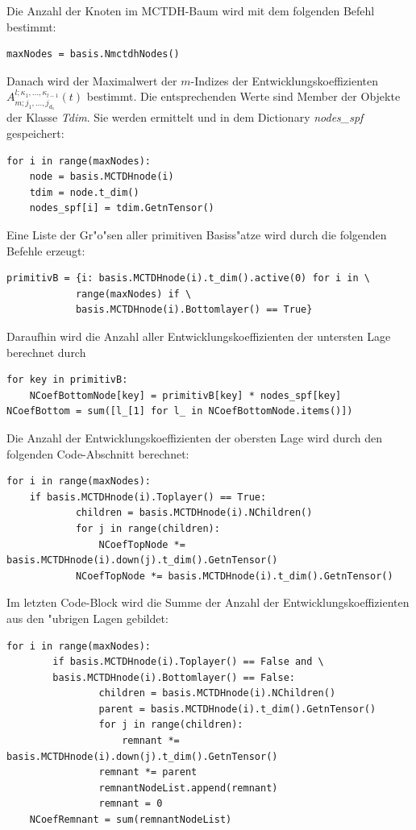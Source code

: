 Die Anzahl der Knoten im MCTDH-Baum wird mit dem folgenden Befehl bestimmt:
\begin{verbatim}
maxNodes = basis.NmctdhNodes()
\end{verbatim}
Danach wird der Maximalwert der $m$-Indizes der Entwicklungskoeffizienten $A^{l;\kappa_{1},...,\kappa_{l-1}}_{m;j_1,...,j_{d_{\kappa}}}(t)$ bestimmt.
Die entsprechenden Werte sind Member der Objekte der Klasse \textit{Tdim}.
Sie werden ermittelt und in dem Dictionary \textit{nodes\_spf} gespeichert:
\begin{verbatim}
for i in range(maxNodes):
    node = basis.MCTDHnode(i)
    tdim = node.t_dim()
    nodes_spf[i] = tdim.GetnTensor() 
\end{verbatim}

Eine Liste der Gr"o"sen aller primitiven Basiss"atze wird durch die folgenden Befehle erzeugt:
\begin{verbatim}
primitivB = {i: basis.MCTDHnode(i).t_dim().active(0) for i in \
            range(maxNodes) if \
            basis.MCTDHnode(i).Bottomlayer() == True}
\end{verbatim}

Daraufhin wird die Anzahl aller Entwicklungskoeffizienten der untersten Lage berechnet durch
\begin{verbatim}
for key in primitivB:
    NCoefBottomNode[key] = primitivB[key] * nodes_spf[key]
NCoefBottom = sum([l_[1] for l_ in NCoefBottomNode.items()])
\end{verbatim}

Die Anzahl der Entwicklungskoeffizienten der obersten Lage wird durch den folgenden Code-Abschnitt berechnet:

\begin{verbatim}
for i in range(maxNodes):
    if basis.MCTDHnode(i).Toplayer() == True:
            children = basis.MCTDHnode(i).NChildren()
            for j in range(children):
                NCoefTopNode *= basis.MCTDHnode(i).down(j).t_dim().GetnTensor()
            NCoefTopNode *= basis.MCTDHnode(i).t_dim().GetnTensor()
\end{verbatim}

Im letzten Code-Block wird die Summe der Anzahl der Entwicklungskoeffizienten aus
den "ubrigen Lagen gebildet:

\begin{verbatim}
for i in range(maxNodes):
        if basis.MCTDHnode(i).Toplayer() == False and \
        basis.MCTDHnode(i).Bottomlayer() == False:
                children = basis.MCTDHnode(i).NChildren()
                parent = basis.MCTDHnode(i).t_dim().GetnTensor()
                for j in range(children):
                    remnant *= basis.MCTDHnode(i).down(j).t_dim().GetnTensor() 
                remnant *= parent
                remnantNodeList.append(remnant)
                remnant = 0
    NCoefRemnant = sum(remnantNodeList)
\end{verbatim}

